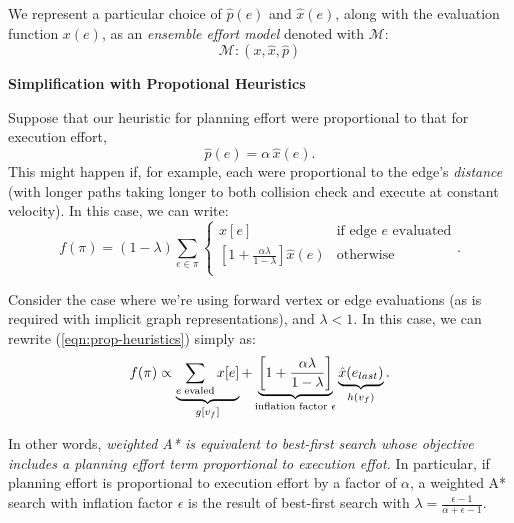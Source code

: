 We represent a particular choice of $\hat{p}(e)$
and $\hat{x}(e)$,
along with the evaluation function $x(e)$,
as an \emph{ensemble effort model}
denoted with $\mathcal{M}$:
\begin{equation}
   \mathcal{M} : (x, \hat{x}, \hat{p})
\end{equation}

\vspace{0.1in}
\noindent
\textbf{Simplification with Propotional Heuristics}

Suppose that our heuristic for planning effort
were proportional to that for execution effort,
\begin{equation}
   \hat{p}(e) = \alpha \, \hat{x}(e) .
\end{equation}
This might happen if, for example, each were proportional to the edge's
\emph{distance} (with longer paths taking longer to both collision check
and execute at constant velocity).
In this case, we can write:
\begin{equation}
   f(\pi) = (1-\lambda) \sum_{e \in \pi} \left\{
   \begin{array}{cl}
      x[e] & \mbox{if edge } e \mbox{ evaluated}  \\
      \left[ 1 + \frac{\alpha\lambda}{1 - \lambda} \right] \hat{x}(e) & \mbox{otherwise} \\
   \end{array}
   \right.
   .
   \label{eqn:prop-heuristics}
\end{equation}

Consider the case where we're using forward vertex or edge evaluations
(as is required with implicit graph representations),
and $\lambda < 1$.
In this case, we can rewrite (\ref{eqn:prop-heuristics})
simply as:
\begin{equation}
   f(\pi) \propto
   \underbrace{\sum_{e \; \mbox{\scriptsize evaled}} x[e]}_{g[v_f]}
   +
   \underbrace{\left[ 1 + \frac{\alpha \lambda}{1-\lambda} \right]}_{
      \mbox{\scriptsize inflation factor } \epsilon}
   \underbrace{\hat{x}(e_{last})}_{h(v_f)}
   .
\end{equation}

In other words,
\emph{weighted A* is equivalent to
   best-first search whose objective
   includes a planning effort term
   proportional to execution effot.}
In particular, if planning effort is proportional to execution
effort by a factor of $\alpha$,
a weighted A* search with inflation factor $\epsilon$
is the result of best-first search with
$\lambda = \frac{\epsilon-1}{\alpha+\epsilon-1}$.

